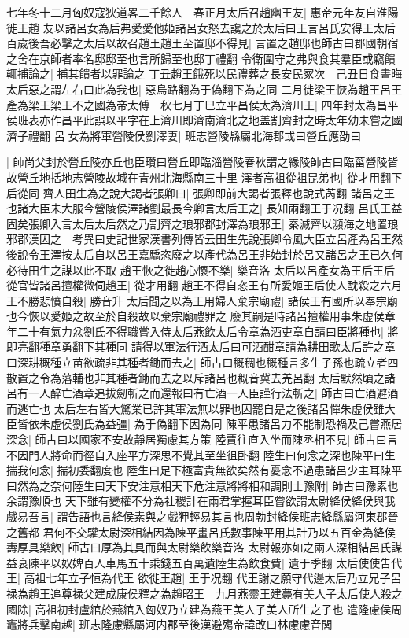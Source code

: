 七年冬十二月匈奴寇狄道畧二千餘人　春正月太后召趙幽王友|{
	惠帝元年友自淮陽徙王趙}
友以諸呂女為后弗愛愛他姬諸呂女怒去讒之於太后曰王言呂氏安得王太后百歲後吾必擊之太后以故召趙王趙王至置邸不得見|{
	言置之趙邸也師古曰郡國朝宿之舍在京師者率名邸邸至也言所歸至也邸丁禮翻}
令衛圍守之弗與食其羣臣或竊饋輒捕論之|{
	捕其饋者以罪論之}
丁丑趙王餓死以民禮葬之長安民冢次　己丑日食晝晦太后惡之謂左右曰此為我也|{
	惡烏路翻為于偽翻下為之同}
二月徙梁王恢為趙王呂王產為梁王梁王不之國為帝太傅　秋七月丁巳立平昌侯太為濟川王|{
	四年封太為昌平侯班表亦作昌平此誤以平字在上濟川即濟南濟北之地盖割齊封之時太年幼未嘗之國濟子禮翻}
呂女為將軍營陵侯劉澤妻|{
	班志營陵縣屬北海郡或曰營丘應劭曰}


|{
	師尚父封於營丘陵亦丘也臣瓚曰營丘即臨淄營陵春秋謂之緣陵師古曰臨菑營陵皆故營丘地括地志營陵故城在青州北海縣南三十里}
澤者高祖從祖昆弟也|{
	從才用翻下后從同}
齊人田生為之說大謁者張卿曰|{
	張卿即前大謁者張釋也說式芮翻}
諸呂之王也諸大臣未大服今營陵侯澤諸劉最長今卿言太后王之|{
	長知兩翻王于况翻}
呂氏王益固矣張卿入言太后太后然之乃割齊之琅邪郡封澤為琅邪王|{
	秦滅齊以瀕海之地置琅邪郡漢因之　考異曰史記世家漢書列傳皆云田生先說張卿令風大臣立呂產為呂王然後說令王澤按太后自以呂王嘉驕恣廢之以產代為呂王非始封於呂又諸呂之王已久何必待田生之謀以此不取}
趙王恢之徙趙心懷不樂|{
	樂音洛}
太后以呂產女為王后王后從官皆諸呂擅權微伺趙王|{
	從才用翻}
趙王不得自恣王有所愛姬王后使人酖殺之六月王不勝悲憤自殺|{
	勝音升}
太后聞之以為王用婦人棄宗廟禮|{
	諸侯王有國所以奉宗廟也今恢以愛姬之故至於自殺故以棄宗廟禮罪之}
廢其嗣是時諸呂擅權用事朱虚侯章年二十有氣力忿劉氏不得職嘗入侍太后燕飲太后令章為酒吏章自請曰臣將種也|{
	將即亮翻種章勇翻下其種同}
請得以軍法行酒太后曰可酒酣章請為耕田歌太后許之章曰深耕穊種立苗欲疏非其種者鋤而去之|{
	師古曰穊稠也穊種言多生子孫也疏立者四散置之令為藩輔也非其種者鋤而去之以斥諸呂也穊音冀去羌呂翻}
太后默然頃之諸呂有一人醉亡酒章追拔劒斬之而還報曰有亡酒一人臣謹行法斬之|{
	師古曰亡酒避酒而逃亡也}
太后左右皆大驚業已許其軍法無以罪也因罷自是之後諸呂憚朱虚侯雖大臣皆依朱虛侯劉氏為益彊|{
	為于偽翻下因為同}
陳平患諸呂力不能制恐禍及己嘗燕居深念|{
	師古曰以國家不安故靜居獨慮其方策}
陸賈往直入坐而陳丞相不見|{
	師古曰言不因門人將命而徑自入座平方深思不覺其至坐徂卧翻}
陸生曰何念之深也陳平曰生揣我何念|{
	揣初委翻度也}
陸生曰足下極富貴無欲矣然有憂念不過患諸呂少主耳陳平曰然為之奈何陸生曰天下安注意相天下危注意將將相和調則士豫附|{
	師古曰豫素也余謂豫順也}
天下雖有變權不分為社稷計在兩君掌握耳臣嘗欲謂太尉絳侯絳侯與我戲易吾言|{
	謂告語也言絳侯素與之戲狎輕易其言也周勃封絳侯班志絳縣屬河東郡晉之舊都}
君何不交驩太尉深相結因為陳平畫呂氏數事陳平用其計乃以五百金為絳侯夀厚具樂飲|{
	師古曰厚為其具而與太尉樂飲樂音洛}
太尉報亦如之兩人深相結呂氏謀益衰陳平以奴婢百人車馬五十乘錢五百萬遺陸生為飲食費|{
	遺于季翻}
太后使使吿代王|{
	高祖七年立子恒為代王}
欲徙王趙|{
	王于况翻}
代王謝之願守代邊太后乃立兄子呂禄為趙王追尊禄父建成康侯釋之為趙昭王　九月燕靈王建薨有美人子太后使人殺之國除|{
	高祖初封盧綰於燕綰入匈奴乃立建為燕王美人子美人所生之子也}
遣隆慮侯周竈將兵擊南越|{
	班志隆慮縣屬河内郡至後漢避殤帝諱改曰林慮慮音閭}


